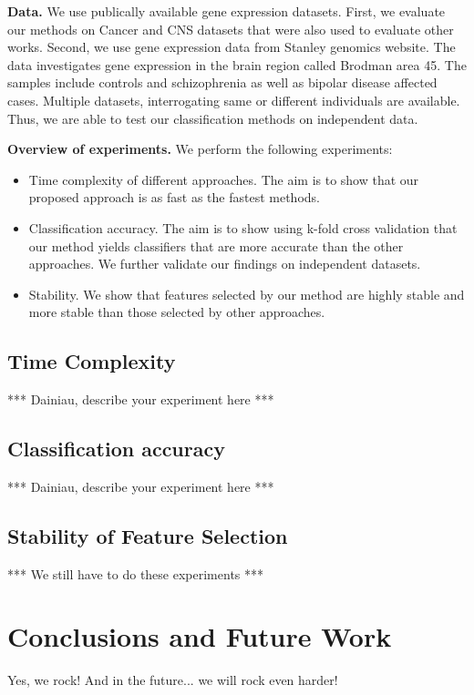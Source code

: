 \documentclass{llncs}
\newcommand{\jg}[1]{{\color{red}*** #1 ***}}
\begin{document}
\textbf{Data.} We use publically available gene expression datasets. First, we evaluate our methods on Cancer and CNS datasets that were also used to evaluate other works. Second, we use gene expression data from Stanley genomics website. The data investigates gene expression in the brain region called Brodman area 45. The samples include controls and schizophrenia as well as bipolar disease affected cases. Multiple datasets, interrogating same or different individuals are available. Thus, we are able to test our classification methods on independent data.

\textbf{Overview of experiments.} We perform the following experiments:
\begin{itemize}
	\item Time complexity of different approaches. The aim is to show that our proposed approach is as fast as the fastest methods. 
	\item Classification accuracy. The aim is to show using k-fold cross validation that our method yields classifiers that are more accurate than the other approaches. We further validate our findings on independent datasets.
	\item Stability. We show that features selected by our method are highly stable and more stable than those selected by other approaches.
\end{itemize}


\subsection{Time Complexity} %
\label{sub:time_complexity}

\jg{Dainiau, describe your experiment here}


\subsection{Classification accuracy} %
\label{sub:classification_accuracy}

\jg{Dainiau, describe your experiment here}


\subsection{Stability of Feature Selection} %
\label{sub:stability_of_feature_selection}

\jg{We still have to do these experiments}


\section{Conclusions and Future Work}

Yes, we rock! And in the future... we will rock even harder!




\end{document}
